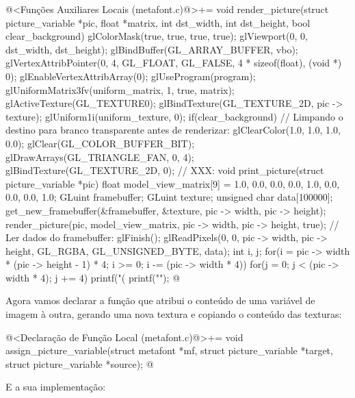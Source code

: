 {{{{{{\iniciocodigo
@<Funções Auxiliares Locais (metafont.c)@>+=
void render_picture(struct picture_variable *pic, float *matrix, int dst_width,
                    int dst_height, bool clear_background){
  glColorMask(true, true, true, true);
  glViewport(0, 0, dst_width, dst_height);
  glBindBuffer(GL_ARRAY_BUFFER, vbo);
  glVertexAttribPointer(0, 4, GL_FLOAT, GL_FALSE, 4 * sizeof(float), (void *) 0);
  glEnableVertexAttribArray(0);
  glUseProgram(program);
  glUniformMatrix3fv(uniform_matrix, 1, true, matrix);
  glActiveTexture(GL_TEXTURE0);
  glBindTexture(GL_TEXTURE_2D, pic -> texture);
  glUniform1i(uniform_texture, 0);
  if(clear_background){
    // Limpando o destino para branco transparente antes de renderizar:
    glClearColor(1.0, 1.0, 1.0, 0.0);
    glClear(GL_COLOR_BUFFER_BIT);
  }
  glDrawArrays(GL_TRIANGLE_FAN, 0, 4);
  glBindTexture(GL_TEXTURE_2D, 0);
}
// XXX:
void print_picture(struct picture_variable *pic){
  float model_view_matrix[9] = {1.0, 0.0, 0.0,
                               0.0, 1.0, 0.0,
                               0.0, 0.0, 1.0};
  GLuint framebuffer;
  GLuint texture;
  unsigned char data[100000];
  get_new_framebuffer(&framebuffer, &texture, pic -> width, pic -> height);
  render_picture(pic, model_view_matrix, pic -> width, pic -> height, true);
  // Ler dados do framebuffer:
  glFinish();
  glReadPixels(0, 0, pic -> width, pic -> height, GL_RGBA, GL_UNSIGNED_BYTE, data);
  {
    int i, j;
    for(i = pic -> width * (pic -> height - 1) * 4;
        i >= 0; i -= (pic -> width * 4)){
      for(j = 0; j < (pic -> width * 4); j += 4)
        printf("(%
        printf("\n");
    }
  }
}
@
\fimcodigo

Agora vamos declarar a função que atribui o conteúdo de uma variável
de imagem à outra, gerando uma nova textura e copiando o conteúdo das
texturas:

\iniciocodigo
@<Declaração de Função Local (metafont.c)@>+=
void assign_picture_variable(struct metafont *mf,
                             struct picture_variable *target,
                             struct picture_variable *source);
@
\fimcodigo

E a sua implementação:

}}}}}}

